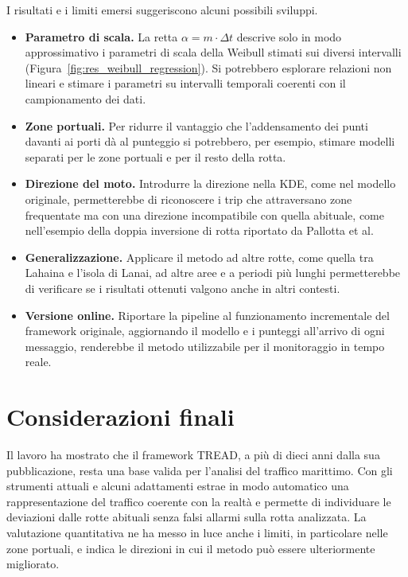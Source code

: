 I risultati e i limiti emersi suggeriscono alcuni possibili sviluppi.
\begin{itemize}
    \item \textbf{Parametro di scala.} La retta $\alpha = m \cdot \Delta t$ descrive solo in modo approssimativo i parametri di scala della Weibull stimati sui diversi intervalli (Figura~\ref{fig:res_weibull_regression}). Si potrebbero esplorare relazioni non lineari e stimare i parametri su intervalli temporali coerenti con il campionamento dei dati.
    \item \textbf{Zone portuali.} Per ridurre il vantaggio che l'addensamento dei punti davanti ai porti dà al punteggio si potrebbero, per esempio, stimare modelli separati per le zone portuali e per il resto della rotta.
    \item \textbf{Direzione del moto.} Introdurre la direzione nella KDE, come nel modello originale, permetterebbe di riconoscere i trip che attraversano zone frequentate ma con una direzione incompatibile con quella abituale, come nell'esempio della doppia inversione di rotta riportato da Pallotta et al.
    \item \textbf{Generalizzazione.} Applicare il metodo ad altre rotte, come quella tra Lahaina e l'isola di Lanai, ad altre aree e a periodi più lunghi permetterebbe di verificare se i risultati ottenuti valgono anche in altri contesti.
    \item \textbf{Versione online.} Riportare la pipeline al funzionamento incrementale del framework originale, aggiornando il modello e i punteggi all'arrivo di ogni messaggio, renderebbe il metodo utilizzabile per il monitoraggio in tempo reale.
\end{itemize}

\clearpage
\section[Considerazioni finali]{Considerazioni finali}\label{sec:concl_final}

Il lavoro ha mostrato che il framework TREAD, a più di dieci anni dalla sua pubblicazione, resta una
base valida per l'analisi del traffico marittimo. Con gli strumenti attuali e alcuni adattamenti
estrae in modo automatico una rappresentazione del traffico coerente con la realtà e permette di
individuare le deviazioni dalle rotte abituali senza falsi allarmi sulla rotta analizzata. La
valutazione quantitativa ne ha messo in luce anche i limiti, in particolare nelle zone portuali, e
indica le direzioni in cui il metodo può essere ulteriormente migliorato.
